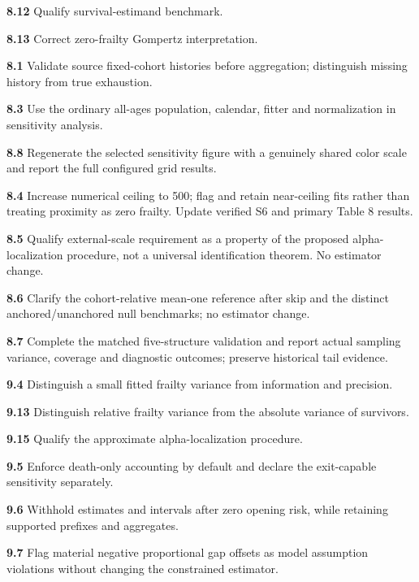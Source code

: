 \documentclass[
]{article}
\begin{document}
\par\hypertarget{issue-8.12}{}\textbf{8.12} Qualify survival-estimand benchmark.
\par\hypertarget{issue-8.13}{}\textbf{8.13} Correct zero-frailty Gompertz interpretation.
\par\hypertarget{issue-8.1}{}\textbf{8.1} Validate source fixed-cohort histories before aggregation; distinguish missing history from true exhaustion.
\par\hypertarget{issue-8.3}{}\textbf{8.3} Use the ordinary all-ages population, calendar, fitter and normalization in sensitivity analysis.
\par\hypertarget{issue-8.8}{}\textbf{8.8} Regenerate the selected sensitivity figure with a genuinely shared color scale and report the full configured grid results.
\par\hypertarget{issue-8.4}{}\textbf{8.4} Increase numerical ceiling to 500; flag and retain near-ceiling fits rather than treating proximity as zero frailty. Update verified S6 and primary Table 8 results.
\par\hypertarget{issue-8.5}{}\textbf{8.5} Qualify external-scale requirement as a property of the proposed alpha-localization procedure, not a universal identification theorem. No estimator change.
\par\hypertarget{issue-8.6}{}\textbf{8.6} Clarify the cohort-relative mean-one reference after skip and the distinct anchored/unanchored null benchmarks; no estimator change.
\par\hypertarget{issue-8.7}{}\textbf{8.7} Complete the matched five-structure validation and report actual sampling variance, coverage and diagnostic outcomes; preserve historical tail evidence.
\par\hypertarget{issue-9.4}{}\textbf{9.4} Distinguish a small fitted frailty variance from information and precision.
\par\hypertarget{issue-9.13}{}\textbf{9.13} Distinguish relative frailty variance from the absolute variance of survivors.
\par\hypertarget{issue-9.15}{}\textbf{9.15} Qualify the approximate alpha-localization procedure.
\par\hypertarget{issue-9.5}{}\textbf{9.5} Enforce death-only accounting by default and declare the exit-capable sensitivity separately.
\par\hypertarget{issue-9.6}{}\textbf{9.6} Withhold estimates and intervals after zero opening risk, while retaining supported prefixes and aggregates.
\par\hypertarget{issue-9.7}{}\textbf{9.7} Flag material negative proportional gap offsets as model assumption violations without changing the constrained estimator.
\end{document}
